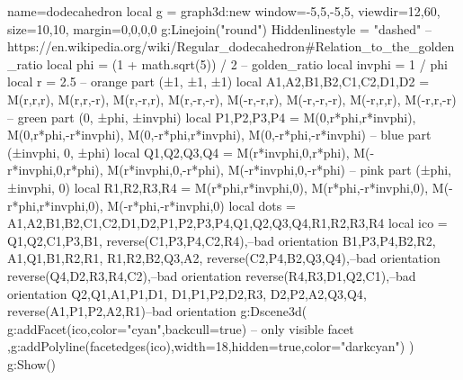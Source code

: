 \documentclass{standalone}
\begin{document}
    \begin{luadraw}{name=dodecahedron}
    local g = graph3d:new{ 
        window={-5,5,-5,5},
        viewdir={12,60}, 
        size={10,10}, 
        margin={0,0,0,0}
    }
    g:Linejoin("round")
    Hiddenlinestyle = "dashed"
    -- https://en.wikipedia.org/wiki/Regular_dodecahedron#Relation_to_the_golden_ratio
    local phi = (1 + math.sqrt(5)) / 2 -- golden_ratio
    local invphi = 1 / phi 
    local r = 2.5
    -- orange part (±1, ±1, ±1)
    local A1,A2,B1,B2,C1,C2,D1,D2 = M(r,r,r), M(r,r,-r), M(r,-r,r), M(r,-r,-r), M(-r,-r,r), M(-r,-r,-r), M(-r,r,r), M(-r,r,-r)
    -- green part (0, ±phi, ±invphi)
    local P1,P2,P3,P4 = M(0,r*phi,r*invphi), M(0,r*phi,-r*invphi), M(0,-r*phi,r*invphi), M(0,-r*phi,-r*invphi)
    -- blue part (±invphi, 0, ±phi)
    local Q1,Q2,Q3,Q4 = M(r*invphi,0,r*phi), M(-r*invphi,0,r*phi), M(r*invphi,0,-r*phi),  M(-r*invphi,0,-r*phi)
    -- pink part (±phi, ±invphi, 0)
    local R1,R2,R3,R4 = M(r*phi,r*invphi,0), M(r*phi,-r*invphi,0), M(-r*phi,r*invphi,0), M(-r*phi,-r*invphi,0)
    local dots = {A1,A2,B1,B2,C1,C2,D1,D2,P1,P2,P3,P4,Q1,Q2,Q3,Q4,R1,R2,R3,R4}
    local ico = {
        {Q1,Q2,C1,P3,B1},
        reverse({C1,P3,P4,C2,R4}),--bad orientation
        {B1,P3,P4,B2,R2},
        {A1,Q1,B1,R2,R1},
        {R1,R2,B2,Q3,A2},
        reverse({C2,P4,B2,Q3,Q4}),--bad orientation
        reverse({Q4,D2,R3,R4,C2}),--bad orientation
        reverse({R4,R3,D1,Q2,C1}),--bad orientation
        {Q2,Q1,A1,P1,D1},
        {D1,P1,P2,D2,R3},
        {D2,P2,A2,Q3,Q4},
        reverse({A1,P1,P2,A2,R1})--bad orientation
    }
    g:Dscene3d( 
        g:addFacet(ico,{color="cyan",backcull=true}) -- only visible facet
        ,g:addPolyline(facetedges(ico),{width=18,hidden=true,color="darkcyan"})
    )
    g:Show()  
    \end{luadraw}
\end{document}
